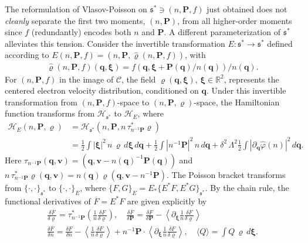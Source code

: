 \documentclass[%
 aip,
 amsmath,amssymb,
reprint, onecolumn %
]{revtex4-1}
\begin{document}
The reformulation of Vlasov-Poisson on $\mathfrak{s}^*\ni (n,\bm{P},f)$ just obtained does not \emph{cleanly} separate the first two moments, $(n,\bm{P})$, from all higher-order moments since $f$ (redundantly) encodes both $n$ and $\bm{P}$. A different parameterization of $\mathfrak{s}^*$ alleviates this tension. Consider the invertible transformation $E:\mathfrak{s}^*\rightarrow\mathfrak{s}^*$ defined according to $E(n,\bm{P},f) = (n,\bm{P},\widehat{\varrho}(n,\bm{P},f))$, with
\begin{align*}
\widehat{\varrho}(n,\bm{P},f)(\bm{q},\bm{\xi}) = f(\bm{q},\bm{\xi} + \bm{P}(\bm{q})/n(\bm{q}))/n(\bm{q}).
\end{align*}
For $(n,\bm{P},f)$ in the image of $\mathcal{C}$, the field $\varrho(\bm{q}, \bm{\xi})$, $\bm{\xi}\in\mathbb{R}^2$, represents the centered electron velocity distribution, conditioned on $\bm{q}$. Under this invertible transformation from $(n,\bm{P},f)$-space to $(n,\bm{P},\varrho)$-space, the Hamiltonian function transforms from $\mathcal{H}_{\mathfrak{s}^*}$ to $\mathcal{H}_E$, where
\begin{align}
\mathcal{H}_E(n,\bm{P},\varrho) &=\mathcal{H}_{\mathfrak{s}^*}(n,\bm{P},n\,\tau_{n^{-1}\bm{P}}^*\varrho)\nonumber \\
& = \frac{1}{2}\int |\bm{\xi}|^2\,n\,\varrho\,d\bm{\xi}\,d\bm{q} + \frac{1}{2}\int|n^{-1}\bm{P}|^2\,n\,d\bm{q} + \delta^2\,\Lambda^2\frac{1}{2}\int |\partial_{\bm{q}}\widehat{\varphi}(n)|^2\,d\bm{q}.\label{VP_chamiltonian}
\end{align}
Here $\tau_{n^{-1}\bm{P}}(\bm{q},\bm{v}) = (\bm{q},\bm{v} - n(\bm{q})^{-1}\bm{P}(\bm{q}))$ and $n\,\tau_{n^{-1}\bm{P}}^*\varrho(\bm{q},\bm{v}) = n(\bm{q})\varrho(\bm{q},\bm{v} - n^{-1}\bm{P})$. The Poisson bracket transforms from $\{\cdot,\cdot\}_{\mathfrak{s}^*}$ to $\{\cdot,\cdot\}_E$, where $\{F,G\}_E = E_*\{E^*F,E^*G\}_{\mathfrak{s}^*}$.
By the chain rule, the functional derivatives of $\overline{F} = E^*F$ are given explicitly by
\begin{gather*}
\frac{\delta \overline{F}}{\delta \varrho} = \tau_{n^{-1}\bm{P}}^*\left(\frac{1}{n}\frac{\delta F}{\delta\varrho}\right),\quad \frac{\delta\overline{F}}{\delta \bm{P}} = \frac{\delta F}{\delta\bm{P}} - \left\langle\partial_{\bm{\xi}}\frac{1}{n}\frac{\delta F}{\delta\varrho}\right\rangle\\
\frac{\delta \overline{F}}{\delta n} = \frac{\delta F}{\delta n} - \left\langle \frac{1}{n}\frac{\delta F}{\delta\varrho}\right\rangle + n^{-1}\bm{P}\cdot\left\langle\partial_{\bm{\xi}}\frac{1}{n}\frac{\delta F}{\delta\varrho}\right\rangle,\quad \langle Q\rangle = \int Q\,\varrho\,d\bm{\xi}.
\end{gather*}
\end{document}
